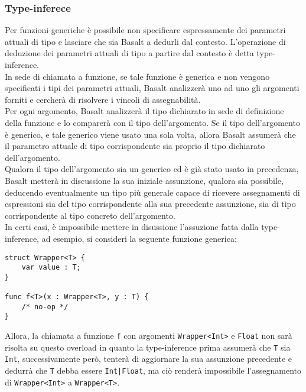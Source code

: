 \subsubsection{Type-inferece}
Per funzioni generiche è possibile non specificare espressamente dei parametri 
attuali di tipo e lasciare che sia Basalt a dedurli dal contesto. 
L’operazione di deduzione dei parametri attuali di tipo a partire dal 
contesto è detta type-inference. \\

In sede di chiamata a funzione, se tale funzione è generica e non vengono specificati
i tipi dei parametri attuali, Basalt analizzerà uno ad uno gli argomenti forniti e cercherà 
di risolvere i vincoli di assegnabilità. \\

Per ogni argomento, Basalt analizzerà il tipo dichiarato in sede di definizione della funzione e 
lo comparerà con il tipo dell'argomento. Se il tipo dell'argomento è generico, e tale generico 
viene usato una sola volta, allora Basalt assumerà che il parametro attuale di tipo corrispondente sia 
proprio il tipo dichiarato dell'argomento. \\

Qualora il tipo dell'argomento sia un generico ed è già stato usato in precedenza, Basalt metterà in discussione
la sua iniziale assunzione, qualora sia possibile, deducendo eventualmente un tipo più generale capace di ricevere assegnamenti di 
espressioni sia del tipo corrispondente alla sua precedente assunzione, sia di tipo corrispondente al tipo concreto 
dell'argomento. \\

In certi casi, è impossibile mettere in disussione l'assuzione fatta dalla type-inference, ad esempio, si consideri 
la seguente funzione generica:

\vspace{0.5cm}
\begin{lstlisting}[frame=single]
struct Wrapper<T> {
    var value : T;
}

func f<T>(x : Wrapper<T>, y : T) { 
    /* no-op */ 
}
\end{lstlisting}
\vspace{0.5cm}

Allora, la chiamata a funzione \texttt{f} con argomenti \texttt{Wrapper<Int>} e \texttt{Float} non sarà 
risolta su questo overload in quanto la type-inference prima assumerà che \texttt{T} sia \texttt{Int}, successivamente 
però, tenterà di aggiornare la sua assunzione precedente e dedurrà che \texttt{T} debba essere \texttt{Int|Float},
ma ciò renderà impossibile l'assegnamento di \texttt{Wrapper<Int>} a \texttt{Wrapper<T>}. \\

